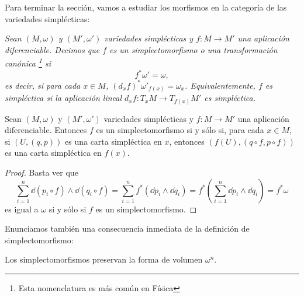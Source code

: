 Para terminar la sección, vamos a estudiar los morfismos en la categoría de las variedades simplécticas:
\begin{defn}
  \em
  Sean $(M,\omega)$ y $(M',\omega')$ variedades simplécticas y $f:M \rightarrow M'$ una aplicación diferenciable. Decimos que $f$ es un \emph{simplectomorfismo} o una \emph{transformación canónica} \footnote{Esta nomenclatura es más común en Física} si
  \begin{equation*}
    f^* \omega' = \omega,
  \end{equation*}
  es decir, si para cada $x\in M$, $(d_xf)^*\omega'_{f(x)}=\omega_x$. Equivalentemente, $f$ es simpléctica si la aplicación lineal $d_xf:T_xM \rightarrow T_{f(x)}M'$ es simpléctica.
\end{defn}
\begin{prop}
  Sean $(M,\omega)$ y $(M',\omega')$ variedades simplécticas y $f:M \rightarrow M'$ una aplicación diferenciable. Entonces $f$ es un simplectomorfismo si y sólo si, para cada $x \in M$, si $(U,(q,p))$ es una carta simpléctica en $x$, entonces $(f(U),(q\circ f, p \circ f))$ es una carta simpléctica en $f(x)$.
\end{prop}
\begin{proof}\leavevmode
Basta ver que
\begin{equation*}
  \sum_{i=1}^n \dd (p_i \circ f) \wedge \dd (q_i \circ f) = \sum_{i=1}^n f^* (\dd p_i \wedge \dd q_i) = f^* \left( \sum_{i=1}^n \dd p_i \wedge \dd q_i \right) = f^* \omega
\end{equation*}
es igual a $\omega$ si y sólo si $f$ es un simplectomorfismo.

\end{proof}

Enunciamos también una consecuencia inmediata de la definición de simplectomorfismo:
\begin{prop}\label{volumen}
  Los simplectomorfismos preservan la forma de volumen $\omega^n$.
\end{prop}


